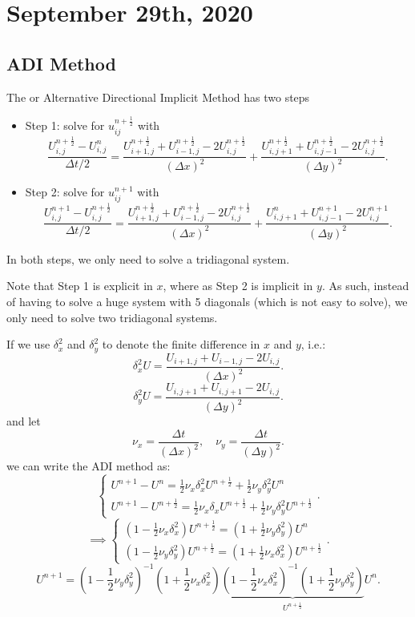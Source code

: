 \documentclass[../main/main.tex]{subfiles}
\begin{document}
\section{September 29th, 2020}
\subsection{ADI Method}
The  or Alternative Directional Implicit Method has two steps
\begin{itemize}
    \item 
Step 1: solve for $u_{ij}^{n+\frac{1}{2}}$ with 
\[
    \frac{U_{i,j}^{n+ \frac{1}{2}}- U_{i,j}^n}{\Delta t / 2} = \frac{U_{i+1,j}^{n+\frac{1}{2}}+U_{i-1,j}^{n+\frac{1}{2}}-2U_{i,j}^{n+\frac{1}{2}}}{(\Delta x)^2} +  \frac{U_{i,j+1}^{n+\frac{1}{2}}+U_{i,j-1}^{n+\frac{1}{2}}-2U_{i,j}^{n+\frac{1}{2}}}{(\Delta y)^2} 
.\] 
    \item 
Step 2: solve for $u_{ij}^{n+1}$ with
\[
    \frac{U_{i,j}^{n+ 1}- U_{i,j}^{n+\frac{1}{2}}}{\Delta t / 2} = \frac{U_{i+1,j}^{n+\frac{1}{2}}+U_{i-1,j}^{n+\frac{1}{2}}-2U_{i,j}^{n+\frac{1}{2}}}{(\Delta x)^2} +  \frac{U_{i,j+1}^{n}+U_{i,j-1}^{n+1}-2U_{i,j}^{n+1}}{(\Delta y)^2} 
.\] 
\end{itemize}
In both steps, we only need to solve a tridiagonal system. 
\begin{remark}
    Note that Step 1 is explicit in $x$, where as Step 2 is implicit in  $y$. As such, instead of having to solve a huge system with 5 diagonals (which is not easy to solve), we only need to solve two tridiagonal systems. 
\end{remark}
If we use $\delta_x^2$ and $\delta_y^2$ to denote the finite difference in $x$ and  $y$, i.e.:  \[
    \delta_x ^2 U = \frac{U_{i+1,j}+U_{i-1,j}-2U_{i,j}}{(\Delta x)^2}
.\]\[ 
    \delta_y ^2 U = \frac{U_{i,j+1}+U_{i,j+1}-2U_{i,j}}{(\Delta y)^2}
.\] and let \[
\nu_x = \frac{\Delta t}{(\Delta x)^2},\quad \nu_y = \frac{\Delta t}{(\Delta y)^2}
.\]  we can write the ADI method as: \[
\begin{cases} 
U^{n+1} - U^{n} = \frac{1}{2} \nu_x \delta_x^2U^{n+\frac{1}2} + \frac{1}{2} \nu_y \delta_y^2 U^n\\
U^{n+1} - U^{n+\frac{1}{2}} = \frac{1}{2} \nu_x \delta_x U^{n+\frac{1}{2}} + \frac{1}{2}\nu_y \delta_y^2 U^{n+\frac{1}{2}}
\end{cases}
.\] \[
\implies 
\begin{cases}
    (1-\frac{1}2 \nu_x \delta_x^2)U^{n+\frac{1}{2}} = (1+\frac{1}{2}\nu_y \delta_y^2)U^n\\
    (1-\frac{1}2 \nu_y \delta_y^2)U^{n+\frac{1}{2}} = (1+\frac{1}{2}\nu_x \delta_x^2)U^{n+\frac{1}{2}}
\end{cases}
.\] \[
U^{n+1} = (1-\frac{1}{2}\nu_y \delta_y^2)^{-1}(1+\frac{1}{2}\nu_x\delta_x^2) \underbrace{(1-\frac{1}{2}\nu_x\delta_x^2)^{-1}(1+\frac{1}{2}\nu_y \delta_y^2)}_{U^{n+\frac{1}{2}}}U^n
.\] 
\end{document}
